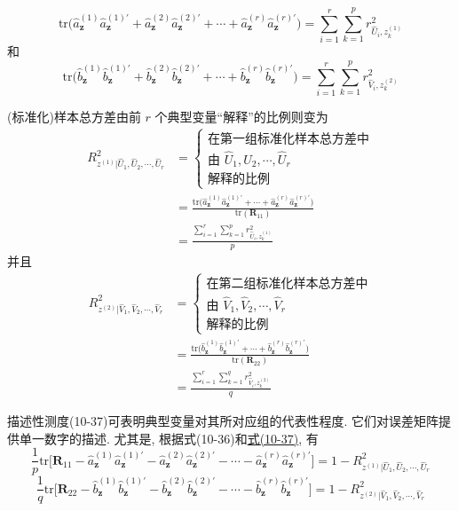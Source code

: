 
\[
\mathrm{tr}\big(\hat{a}_{\mathbf{z}}^{(1)}\hat{a}_{\mathbf{z}}^{(1)'}+\hat{a}_{\mathbf{z}}^{(2)}\hat{a}_{\mathbf{z}}^{(2)'}+\cdots+\hat{a}_{\mathbf{z}}^{(r)}\hat{a}_{\mathbf{z}}^{(r)'}\big)=\sum_{i=1}^{r}\sum_{k=1}^{p}r^2_{\hat{U}_i,z_k^{(1)}}
\]
和
\[
\mathrm{tr}\big(\hat{b}_{\mathbf{z}}^{(1)}\hat{b}_{\mathbf{z}}^{(1)'}+\hat{b}_{\mathbf{z}}^{(2)}\hat{b}_{\mathbf{z}}^{(2)'}+\cdots+\hat{b}_{\mathbf{z}}^{(r)}\hat{b}_{\mathbf{z}}^{(r)'}\big)=\sum_{i=1}^{r}\sum_{k=1}^{p}r^2_{\hat{V}_i,z_k^{(2)}}
\]

(标准化)样本总方差由前 $r$ 个典型变量“解释”的比例则变为
\label{eq:10-37}
\begin{equation}
\begin{aligned}
R^2_{z^{(1)}|\hat{U}_1,\hat{U}_2,\cdots,\hat{U}_r}&=\left\{\begin{array}{l}\text{在第一组标准化样本总方差中}\\[2pt]\text{由 }\hat{U}_1,\hat{U}_2,\cdots,\hat{U}_r\\[2pt]\text{解释的比例}\end{array}\right.\\
&=\frac{\mathrm{tr}\big(\hat{a}_{\mathbf{z}}^{(1)}\hat{a}_{\mathbf{z}}^{(1)'}+\cdots+\hat{a}_{\mathbf{z}}^{(r)}\hat{a}_{\mathbf{z}}^{(r)'}\big)}{\mathrm{tr}(\mathbf{R}_{11})}\\
&=\frac{\displaystyle\sum_{i=1}^{r}\sum_{k=1}^{p}r^2_{\hat{U}_i,z_k^{(1)}}}{p}
\end{aligned}
\tag{10-37}
\end{equation}
并且
\[
\begin{aligned}
R^2_{z^{(2)}|\hat{V}_1,\hat{V}_2,\cdots,\hat{V}_r}&=\left\{\begin{array}{l}\text{在第二组标准化样本总方差中}\\[2pt]\text{由 }\hat{V}_1,\hat{V}_2,\cdots,\hat{V}_r\\[2pt]\text{解释的比例}\end{array}\right.\\
&=\frac{\mathrm{tr}\big(\hat{b}_{\mathbf{z}}^{(1)}\hat{b}_{\mathbf{z}}^{(1)'}+\cdots+\hat{b}_{\mathbf{z}}^{(r)}\hat{b}_{\mathbf{z}}^{(r)'}\big)}{\mathrm{tr}(\mathbf{R}_{22})}\\
&=\frac{\displaystyle\sum_{i=1}^{r}\sum_{k=1}^{q}r^2_{\hat{V}_i,z_k^{(2)}}}{q}
\end{aligned}
\]

描述性测度(10-37)可表明典型变量对其所对应组的代表性程度. 它们对误差矩阵提供单一数字的描述. 尤其是, 根据式(10-36)和\hyperref[eq:10-37]{式(10-37)}, 有
\[
\frac{1}{p}\mathrm{tr}\big[\mathbf{R}_{11}-\hat{a}_{\mathbf{z}}^{(1)}\hat{a}_{\mathbf{z}}^{(1)'}-\hat{a}_{\mathbf{z}}^{(2)}\hat{a}_{\mathbf{z}}^{(2)'}-\cdots-\hat{a}_{\mathbf{z}}^{(r)}\hat{a}_{\mathbf{z}}^{(r)'}\big]=1-R^2_{z^{(1)}|\hat{U}_1,\hat{U}_2,\cdots,\hat{U}_r}
\]
\[
\frac{1}{q}\mathrm{tr}\big[\mathbf{R}_{22}-\hat{b}_{\mathbf{z}}^{(1)}\hat{b}_{\mathbf{z}}^{(1)'}-\hat{b}_{\mathbf{z}}^{(2)}\hat{b}_{\mathbf{z}}^{(2)'}-\cdots-\hat{b}_{\mathbf{z}}^{(r)}\hat{b}_{\mathbf{z}}^{(r)'}\big]=1-R^2_{z^{(2)}|\hat{V}_1,\hat{V}_2,\cdots,\hat{V}_r}
\]

